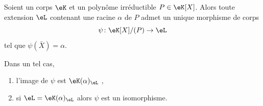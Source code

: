 \begin{proposition}          \label{PROPooVJACooNDmlfb}
	Soient un corps \( \eK\) et un polynôme irréductible \( P\in \eK[X]\). Alors toute extension \( \eL\) contenant une racine \( \alpha\) de \( P\) admet un unique morphisme de corps
	\begin{equation}
		\psi\colon \eK[X]/(P)\to \eL
	\end{equation}
	tel que \( \psi(\bar X)=\alpha\).

	Dans un tel cas,
	\begin{enumerate}
		\item
		      l'image de \( \psi\) est \( \eK(\alpha)_{\eL}\) ,
		\item       \label{ITEMooHRFHooWLIdWU}
		      si \( \eL=\eK(\alpha)_{\eL}\) alors \( \psi\) est un isomorphisme.
	\end{enumerate}

\end{proposition}


